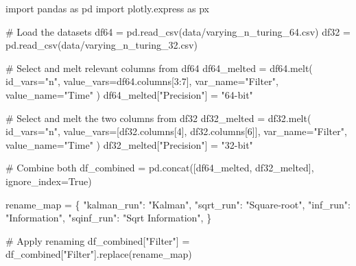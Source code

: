 \documentclass[
]{report}
\newenvironment{Shaded}{\begin{snugshade}}{\end{snugshade}}
\newcommand{\CommentTok}[1]{\textcolor[rgb]{0.37,0.37,0.37}{#1}}
\newcommand{\DecValTok}[1]{\textcolor[rgb]{0.68,0.00,0.00}{#1}}
\newcommand{\ImportTok}[1]{\textcolor[rgb]{0.00,0.46,0.62}{#1}}
\newcommand{\NormalTok}[1]{\textcolor[rgb]{0.00,0.23,0.31}{#1}}
\newcommand{\OperatorTok}[1]{\textcolor[rgb]{0.37,0.37,0.37}{#1}}
\newcommand{\StringTok}[1]{\textcolor[rgb]{0.13,0.47,0.30}{#1}}
\newcommand{\VariableTok}[1]{\textcolor[rgb]{0.07,0.07,0.07}{#1}}
\begin{document}
\begin{Shaded}
\begin{Highlighting}[]
\ImportTok{import}\NormalTok{ pandas }\ImportTok{as}\NormalTok{ pd}
\ImportTok{import}\NormalTok{ plotly.express }\ImportTok{as}\NormalTok{ px}

\CommentTok{\# Load the datasets}
\NormalTok{df64 }\OperatorTok{=}\NormalTok{ pd.read\_csv(}\StringTok{\textquotesingle{}data/varying\_n\_turing\_64.csv\textquotesingle{}}\NormalTok{)}
\NormalTok{df32 }\OperatorTok{=}\NormalTok{ pd.read\_csv(}\StringTok{\textquotesingle{}data/varying\_n\_turing\_32.csv\textquotesingle{}}\NormalTok{)}

\CommentTok{\# Select and melt relevant columns from df64}
\NormalTok{df64\_melted }\OperatorTok{=}\NormalTok{ df64.melt(}
\NormalTok{    id\_vars}\OperatorTok{=}\StringTok{"n"}\NormalTok{,}
\NormalTok{    value\_vars}\OperatorTok{=}\NormalTok{df64.columns[}\DecValTok{3}\NormalTok{:}\DecValTok{7}\NormalTok{],}
\NormalTok{    var\_name}\OperatorTok{=}\StringTok{"Filter"}\NormalTok{,}
\NormalTok{    value\_name}\OperatorTok{=}\StringTok{"Time"}
\NormalTok{)}
\NormalTok{df64\_melted[}\StringTok{"Precision"}\NormalTok{] }\OperatorTok{=} \StringTok{"64{-}bit"}

\CommentTok{\# Select and melt the two columns from df32}
\NormalTok{df32\_melted }\OperatorTok{=}\NormalTok{ df32.melt(}
\NormalTok{    id\_vars}\OperatorTok{=}\StringTok{"n"}\NormalTok{,}
\NormalTok{    value\_vars}\OperatorTok{=}\NormalTok{[df32.columns[}\DecValTok{4}\NormalTok{], df32.columns[}\DecValTok{6}\NormalTok{]],}
\NormalTok{    var\_name}\OperatorTok{=}\StringTok{"Filter"}\NormalTok{,}
\NormalTok{    value\_name}\OperatorTok{=}\StringTok{"Time"}
\NormalTok{)}
\NormalTok{df32\_melted[}\StringTok{"Precision"}\NormalTok{] }\OperatorTok{=} \StringTok{"32{-}bit"}

\CommentTok{\# Combine both}
\NormalTok{df\_combined }\OperatorTok{=}\NormalTok{ pd.concat([df64\_melted, df32\_melted], ignore\_index}\OperatorTok{=}\VariableTok{True}\NormalTok{)}

\NormalTok{rename\_map }\OperatorTok{=}\NormalTok{ \{}
    \StringTok{"kalman\_run"}\NormalTok{: }\StringTok{"Kalman"}\NormalTok{,}
    \StringTok{"sqrt\_run"}\NormalTok{: }\StringTok{"Square{-}root"}\NormalTok{,}
    \StringTok{"inf\_run"}\NormalTok{: }\StringTok{"Information"}\NormalTok{,}
    \StringTok{"sqinf\_run"}\NormalTok{: }\StringTok{"Sqrt Information"}\NormalTok{,}
\NormalTok{\}}

\CommentTok{\# Apply renaming}
\NormalTok{df\_combined[}\StringTok{"Filter"}\NormalTok{] }\OperatorTok{=}\NormalTok{ df\_combined[}\StringTok{"Filter"}\NormalTok{].replace(rename\_map)}



\end{Highlighting}
\end{Shaded}
\end{document}
